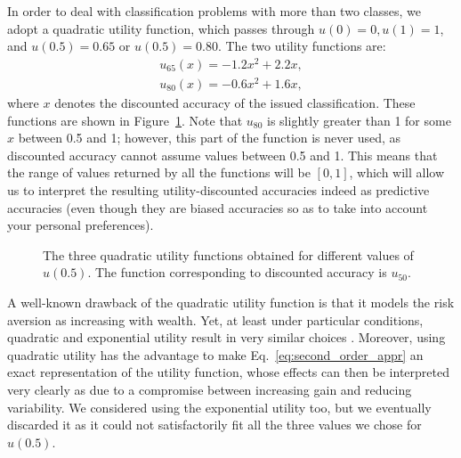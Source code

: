 \documentclass[a4paper,10pt,reqno]{amsart}
\theoremstyle{remark}
\begin{document}
In order to deal with classification problems with more than two classes, we adopt a quadratic utility function, which passes through $u(0)=0,u(1)=1$, and $u(0.5)=0.65$ or $u(0.5)=0.80$. The two utility functions are:
\begin{eqnarray*}
u_{65}(x)=-1.2x^2 + 2.2x,\\
u_{80}(x)=-0.6x^2 + 1.6x,
\end{eqnarray*}
where $x$ denotes the discounted accuracy of the issued classification. These functions are shown in
Figure~\ref{fig:quad_utils}. Note that  $u_{80}$ is slightly greater than 1 for some $x$ between 0.5 and 1; however, this part of the function is never used, as discounted accuracy cannot assume values between 0.5 and 1. This means that the range of values returned by all the functions will be $[0,1]$, which will allow us to interpret the resulting utility-discounted accuracies indeed as predictive accuracies (even though they are biased accuracies so as to take into account your personal preferences).

\begin{figure}
  \centering
  \caption{The three quadratic utility functions obtained for different values of $u(0.5)$. The function corresponding to discounted accuracy is $u_{50}$.}
  \label{fig:quad_utils}
\end{figure}

A well-known drawback of the quadratic utility function is that it models the risk aversion as increasing with wealth.
Yet, at least under particular conditions, quadratic and exponential utility result in very similar choices \cite{buccola1982portfolio}. Moreover, using quadratic utility has the advantage to make Eq.~\eqref{eq:second_order_appr} an exact representation of the utility function, whose effects can then be interpreted very clearly as due to a compromise between increasing gain and reducing variability. We considered using the exponential utility too, but we eventually discarded it as it could not satisfactorily fit all the three values we chose for $u(0.5)$.
\end{document}

